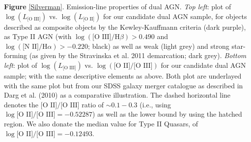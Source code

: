\label{Silverman} \textbf{Figure} \ref{Silverman}. Emission-line properties of dual AGN. \textit{Top left}: plot of $\log{(L_{\text{[O III]}})}$ vs. $\log{(L_{\text{[O II]}})}$ for our candidate dual AGN sample, for objects described as composite objects by the Kewley-Kauffmann criteria (dark purple), as Type II AGN (with $\log(\text{[O III]}/\text{H}\beta)>{0.490}$ and $\log(\text{[N II]}/\text{H}\alpha)>{-0.220}$; black) as well as weak (light grey) and strong star-forming (as given by the Stravinska et al. 2011 demarcation; dark grey). \textit{Bottom left}: plot of $\log{(L_{\text{[O III]}})}$ vs. $\log{(\text{[O II]/[O III]})}$ for our candidate dual AGN sample; with the same descriptive elements as above. Both plot are underlayed with the same plot but from our SDSS galaxy merger catalogue as described in Darg et al. (2010) as a comparative illustration. The dashed horizontal line denotes the \cite{Ferland_1986} $\text{[O II]/[O III]}$ ratio of $\sim{0.1-0.3}$ (i.e., using $\log{\text{[O II]/[O III]}}=-0.52287$) as well as the lower bound by using the hatched region. We also donate the \cite{Zakamska2003} median value for Type II Quasars, of $\log{\text{[O II]/[O III]}}=-0.12493$.